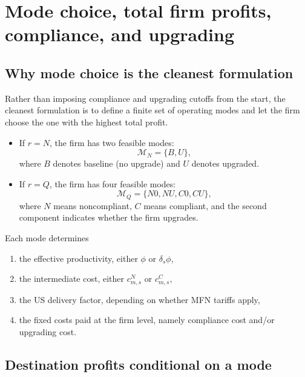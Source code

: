 \documentclass[11pt]{article}
\begin{document}
\section{Mode choice, total firm profits, compliance, and upgrading}

\subsection{Why mode choice is the cleanest formulation}

Rather than imposing compliance and upgrading cutoffs from the start, the cleanest formulation is to define a finite set of operating modes and let the firm choose the one with the highest total profit.

\begin{itemize}[leftmargin=*]
    \item If \(r=N\), the firm has two feasible modes:
    \begin{equation}
    \mathcal{M}_N=\{B,U\},
    \end{equation}
    where \(B\) denotes baseline (no upgrade) and \(U\) denotes upgraded.
    \item If \(r=Q\), the firm has four feasible modes:
    \begin{equation}
    \mathcal{M}_Q=\{N0,NU,C0,CU\},
    \end{equation}
    where \(N\) means noncompliant, \(C\) means compliant, and the second component indicates whether the firm upgrades.
\end{itemize}

Each mode determines
\begin{enumerate}[leftmargin=*]
    \item the effective productivity, either \(\phi\) or \(\delta_s\phi\),
    \item the intermediate cost, either \(c^N_{m,s}\) or \(c^C_{m,s}\),
    \item the US delivery factor, depending on whether MFN tariffs apply,
    \item the fixed costs paid at the firm level, namely compliance cost and/or upgrading cost.
\end{enumerate}

\subsection{Destination profits conditional on a mode}
\end{document}
